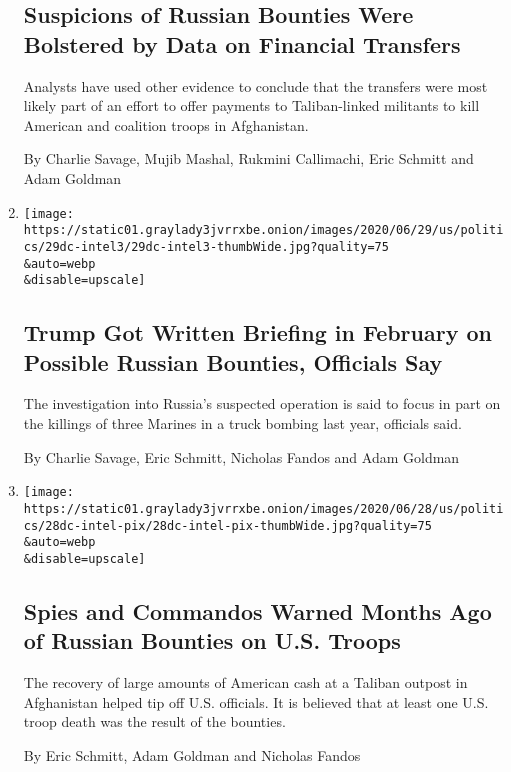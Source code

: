 \begin{enumerate}
  \hypertarget{suspicions-of-russian-bounties-were-bolstered-by-data-on-financial-transfers}{%
  \subsection{Suspicions of Russian Bounties Were Bolstered by Data on
  Financial
  Transfers}\label{suspicions-of-russian-bounties-were-bolstered-by-data-on-financial-transfers}}

  Analysts have used other evidence to conclude that the transfers were
  most likely part of an effort to offer payments to Taliban-linked
  militants to kill American and coalition troops in Afghanistan.

  By Charlie Savage, Mujib Mashal, Rukmini Callimachi, Eric Schmitt and
  Adam Goldman
\item
  \href{/2020/06/29/us/politics/russian-bounty-trump.html}{}

  \texttt{[image: https://static01.graylady3jvrrxbe.onion/images/2020/06/29/us/politics/29dc-intel3/29dc-intel3-thumbWide.jpg?quality=75\\\&auto=webp\\\&disable=upscale]}

  \hypertarget{trump-got-written-briefing-in-february-on-possible-russian-bounties-officials-say}{%
  \subsection{Trump Got Written Briefing in February on Possible Russian
  Bounties, Officials
  Say}\label{trump-got-written-briefing-in-february-on-possible-russian-bounties-officials-say}}

  The investigation into Russia's suspected operation is said to focus
  in part on the killings of three Marines in a truck bombing last year,
  officials said.

  By Charlie Savage, Eric Schmitt, Nicholas Fandos and Adam Goldman
\item
  \href{/2020/06/28/us/politics/russian-bounties-warnings-trump.html}{}

  \texttt{[image: https://static01.graylady3jvrrxbe.onion/images/2020/06/28/us/politics/28dc-intel-pix/28dc-intel-pix-thumbWide.jpg?quality=75\\\&auto=webp\\\&disable=upscale]}

  \hypertarget{spies-and-commandos-warned-months-ago-of-russian-bounties-on-us-troops}{%
  \subsection{Spies and Commandos Warned Months Ago of Russian Bounties
  on U.S.
  Troops}\label{spies-and-commandos-warned-months-ago-of-russian-bounties-on-us-troops}}

  The recovery of large amounts of American cash at a Taliban outpost in
  Afghanistan helped tip off U.S. officials. It is believed that at
  least one U.S. troop death was the result of the bounties.

  By Eric Schmitt, Adam Goldman and Nicholas Fandos
\end{enumerate}

